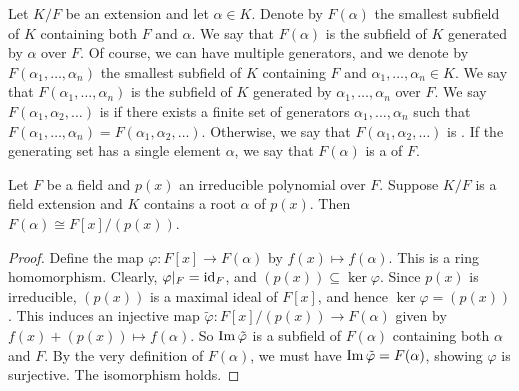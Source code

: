 Let $K/F$ be an extension and let $\alpha \in K$. Denote by $F(\alpha)$ the smallest subfield of $K$ containing both $F$ and $\alpha$. We say that $F(\alpha)$ is the subfield of $K$ generated by $\alpha$ over $F$. Of course, we can have multiple generators, and we denote by $F(\alpha_{1},\ldots,\alpha_{n})$ the smallest subfield of $K$ containing $F$ and $\alpha_{1},\ldots,\alpha_{n} \in K$. We say that $F(\alpha_{1},\ldots,\alpha_{n})$ is the subfield of $K$ generated by $\alpha_{1},\ldots,\alpha_{n}$ over $F$. We say $F(\alpha_{1},\alpha_{2},\ldots)$ is  if there exists a finite set of generators $\alpha_{1},\ldots,\alpha_{n}$ such that $F(\alpha_{1},\ldots,\alpha_{n}) = F(\alpha_{1},\alpha_{2},\ldots)$. Otherwise, we say that $F(\alpha_{1},\alpha_{2},\ldots)$ is . If the generating set has a single element $\alpha$, we say that $F(\alpha)$ is a  of $F$.

\begin{theorem}
    Let $F$ be a field and $p(x)$ an irreducible polynomial over $F$. Suppose $K/F$ is a field extension and $K$ contains a root $\alpha$ of $p(x)$. Then $F(\alpha) \cong F[x]/(p(x))$.
\end{theorem}
\begin{proof}
    Define the map $\varphi : F[x] \to F(\alpha)$ by $f(x) \mapsto f(\alpha)$. This is a ring homomorphism. Clearly, $\varphi|_{F} = \operatorname{id}_{F}$, and $(p(x)) \subseteq \ker \varphi$. Since $p(x)$ is irreducible, $(p(x))$ is a maximal ideal of $F[x]$, and hence $\ker \varphi = (p(x))$. This induces an injective map $\tilde{\varphi} : F[x]/(p(x)) \to F(\alpha)$ given by $f(x)+(p(x)) \mapsto f(\alpha)$. So $\operatorname{Im} \tilde{\varphi}$ is a subfield of $F(\alpha)$ containing both $\alpha$ and $F$. By the very definition of $F(\alpha)$, we must have $\operatorname{Im} \tilde{\varphi} = F(\alpha)$, showing $\varphi$ is surjective. The isomorphism holds.
\end{proof}